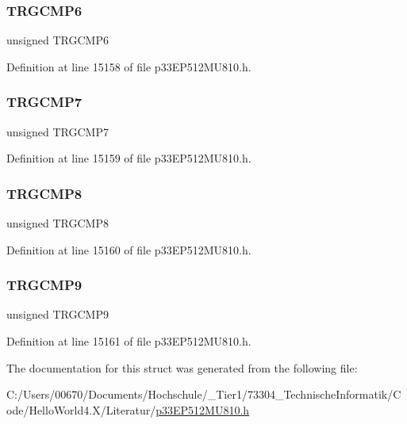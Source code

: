 \subsubsection{\texorpdfstring{T\+R\+G\+C\+M\+P6}{TRGCMP6}}
{\footnotesize\ttfamily unsigned T\+R\+G\+C\+M\+P6}



Definition at line 15158 of file p33\+E\+P512\+M\+U810.\+h.

\mbox{\label{structtag_t_r_i_g5_b_i_t_s_aa801131b5ab0b542a360d202275ea4fd}} 
\subsubsection{\texorpdfstring{T\+R\+G\+C\+M\+P7}{TRGCMP7}}
{\footnotesize\ttfamily unsigned T\+R\+G\+C\+M\+P7}



Definition at line 15159 of file p33\+E\+P512\+M\+U810.\+h.

\mbox{\label{structtag_t_r_i_g5_b_i_t_s_a7d4f3ec40334f00592eb7247457e2fd6}} 
\subsubsection{\texorpdfstring{T\+R\+G\+C\+M\+P8}{TRGCMP8}}
{\footnotesize\ttfamily unsigned T\+R\+G\+C\+M\+P8}



Definition at line 15160 of file p33\+E\+P512\+M\+U810.\+h.

\mbox{\label{structtag_t_r_i_g5_b_i_t_s_a0001e7efb9031bef24e7a19100d11b0b}} 
\subsubsection{\texorpdfstring{T\+R\+G\+C\+M\+P9}{TRGCMP9}}
{\footnotesize\ttfamily unsigned T\+R\+G\+C\+M\+P9}



Definition at line 15161 of file p33\+E\+P512\+M\+U810.\+h.



The documentation for this struct was generated from the following file\+:\begin{DoxyCompactItemize}
\item 
C\+:/\+Users/00670/\+Documents/\+Hochschule/\+\_\+\+Tier1/73304\+\_\+\+Technische\+Informatik/\+Code/\+Hello\+World4.\+X/\+Literatur/\hyperlink{p33_e_p512_m_u810_8h}{p33\+E\+P512\+M\+U810.\+h}\end{DoxyCompactItemize}
